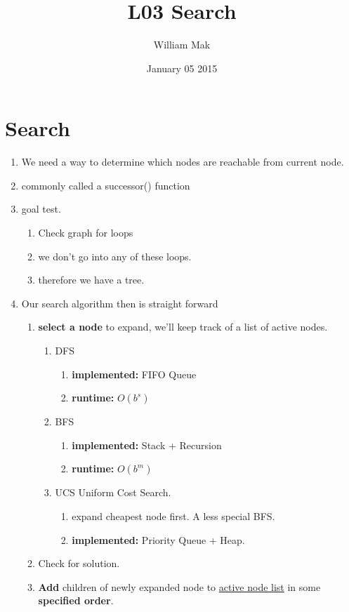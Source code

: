 \documentclass{article}
\title{L03 \- Search}
\author{William Mak}
\date{January 05 2015}
\begin{document}
\maketitle
\section{Search}
\begin{enumerate}
	\item We need a way to determine which nodes are reachable from current
		node.
	\item commonly called a successor() function
	\item goal test.
	\begin{enumerate}
		\item Check graph for loops
		\item we don't go into any of these loops.
		\item therefore we have a tree.
	\end{enumerate}
	\item Our search algorithm then is straight forward
	\begin{enumerate}
		\item \textbf{select a node} to expand, we'll keep track of a list of
			active nodes.
		\begin{enumerate}
			\item DFS
				\begin{enumerate}
					\item \textbf{implemented:} FIFO Queue
					\item \textbf{runtime:} $O(b^s)$
				\end{enumerate}
			\item BFS
				\begin{enumerate}
					\item \textbf{implemented:} Stack + Recursion
					\item \textbf{runtime:} $O(b^m)$
				\end{enumerate}
			\item UCS \- Uniform Cost Search.
				\begin{enumerate}
					\item expand cheapest node first. A less special BFS.
					\item \textbf{implemented:} Priority Queue + Heap.
				\end{enumerate}
		\end{enumerate}
		\item Check for solution.
		\item \textbf{Add} children of newly expanded node to \underline{active
			node list} in some \textbf{specified order}.
	\end{enumerate}
\end{enumerate}
\end{document}
